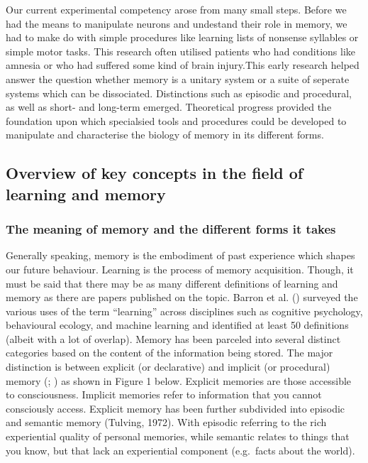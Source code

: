 \documentclass[
  letterpaper,
  DIV=11,
  numbers=noendperiod,
  oneside]{scrartcl}
\begin{document}
Our current experimental competency arose from many small steps. Before
we had the means to manipulate neurons and undestand their role in
memory, we had to make do with simple procedures like learning lists of
nonsense syllables or simple motor tasks. This research often utilised
patients who had conditions like amnesia or who had suffered some kind
of brain injury.This early research helped answer the question whether
memory is a unitary system or a suite of seperate systems which can be
dissociated. Distinctions such as episodic and procedural, as well as
short- and long-term emerged. Theoretical progress provided the
foundation upon which specialsied tools and procedures could be
developed to manipulate and characterise the biology of memory in its
different forms.

\subsection{Overview of key concepts in the field of learning and
memory}\label{overview-of-key-concepts-in-the-field-of-learning-and-memory}

\subsubsection{The meaning of memory and the different forms it
takes}\label{the-meaning-of-memory-and-the-different-forms-it-takes}

Generally speaking, memory is the embodiment of past experience which
shapes our future behaviour. Learning is the process of memory
acquisition. Though, it must be said that there may be as many different
definitions of learning and memory as there are papers published on the
topic. Barron et al. ()
surveyed the various uses of the term ``learning'' across disciplines
such as cognitive psychology, behavioural ecology, and machine learning
and identified at least 50 definitions (albeit with a lot of overlap).
Memory has been parceled into several distinct categories based on the
content of the information being stored. The major distinction is
between explicit (or declarative) and implicit (or procedural) memory
(;
) as shown
in Figure 1 below. Explicit memories are those accessible to
consciousness. Implicit memories refer to information that you cannot
consciously access. Explicit memory has been further subdivided into
episodic and semantic memory (Tulving, 1972). With episodic referring to
the rich experiential quality of personal memories, while semantic
relates to things that you know, but that lack an experiential component
(e.g.~facts about the world).
\end{document}
